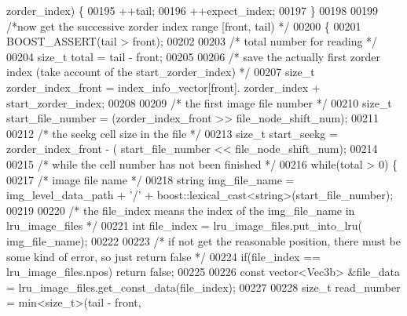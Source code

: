 \begin{DoxyCode}
      zorder\_index) \{
00195                         ++tail;
00196                         ++expect\_index;
00197                 \}
00198 
00199                 \textcolor{comment}{/*now get the successive zorder index range [front, tail) */}
00200                 \{
00201                         BOOST\_ASSERT(tail > front);
00202 
00203                         \textcolor{comment}{/* total number for reading */}
00204                         \textcolor{keywordtype}{size\_t} total = tail - front;
00205 
00206                         \textcolor{comment}{/* save the actually first zorder index (take account
       of the start\_zorder\_index) */}
00207                         \textcolor{keywordtype}{size\_t} zorder\_index\_front = index\_info\_vector[front].
      zorder\_index + start\_zorder\_index;
00208 
00209                         \textcolor{comment}{/* the first image file number */}
00210                         \textcolor{keywordtype}{size\_t} start\_file\_number = (zorder\_index\_front >> 
      file\_node\_shift\_num);
00211 
00212                         \textcolor{comment}{/* the seekg cell size in the file */}
00213                         \textcolor{keywordtype}{size\_t} start\_seekg = zorder\_index\_front - (
      start\_file\_number << file\_node\_shift\_num);
00214 
00215                         \textcolor{comment}{/* while the cell number has not been finished */}
00216                         \textcolor{keywordflow}{while}(total > 0) \{
00217                                 \textcolor{comment}{/* image file name */}
00218                                 \textcolor{keywordtype}{string} img\_file\_name = img\_level\_data\_path + \textcolor{charliteral}{
      '/'} + boost::lexical\_cast<\textcolor{keywordtype}{string}>(start\_file\_number);
00219 
00220                                 \textcolor{comment}{/* the file\_index means the index of the
       img\_file\_name in lru\_image\_files */}
00221                                 \textcolor{keywordtype}{int} file\_index = lru\_image\_files.put\_into\_lru(
      img\_file\_name);
00222 
00223                                 \textcolor{comment}{/* if not get the reasonable position, there
       must be some kind of error, so just return false */}
00224                                 \textcolor{keywordflow}{if}(file\_index == lru\_image\_files.npos)  \textcolor{keywordflow}{return} \textcolor{keyword}{
      false};
00225 
00226                                 \textcolor{keyword}{const} vector<Vec3b> &file\_data = 
      lru\_image\_files.get\_const\_data(file\_index);
00227 
00228                                 \textcolor{keywordtype}{size\_t} read\_number = min<size\_t>(tail - front, 

\end{DoxyCode}
